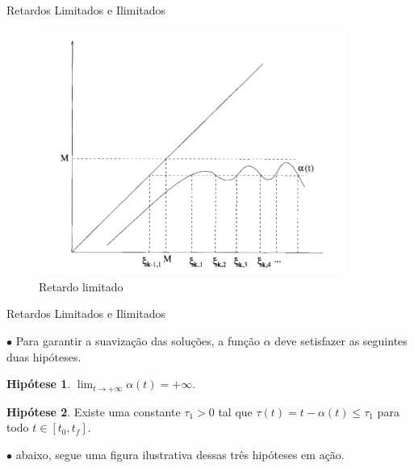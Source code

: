 \documentclass{beamer}
\theoremstyle{plain}
\theoremstyle{definition}
\newtheorem{hip}{Hipótese}
\begin{document}

\begin{frame}{Retardos Limitados e Ilimitados}

    \begin{figure}
        \begin{center}
            \includegraphics[width=0.9\textwidth, height=0.7\textheight]{retardo_limitado.png}
        \end{center}
        \caption{Retardo limitado}\label{fig:Retardo_limitado}
    \end{figure}

\end{frame}



\begin{frame}{Retardos Limitados e Ilimitados}
    
    $\bullet$ Para garantir a suavização das soluções, a função $\alpha$ deve setisfazer as seguintes duas hipóteses.

    \begin{hip}
        \label{H2:hipotese:hypothesis}
        $\lim _{t \rightarrow+\infty} \alpha(t)=+\infty$.
    \end{hip}


    \begin{hip}
        \label{H3:hipotese:hypothesis}
        Existe uma constante \(\tau_{1}>0\) tal que \(\tau(t)=t-\alpha(t) \leq \tau_{1}\) para todo \(t \in\left[t_{0}, t_{f}\right]\).
    \end{hip}

    $\bullet$ abaixo, segue uma figura ilustrativa dessas três hipóteses em ação.

\end{frame}
\end{document}
